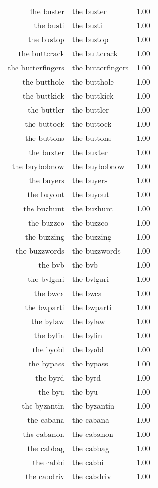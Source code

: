 \begin{table}[ht]
\begin{tabular}{rlr}
  the buster & the buster & 1.00 \\ 
  the busti & the busti & 1.00 \\ 
  the bustop & the bustop & 1.00 \\ 
  the buttcrack & the buttcrack & 1.00 \\ 
  the butterfingers & the butterfingers & 1.00 \\ 
  the butthole & the butthole & 1.00 \\ 
  the buttkick & the buttkick & 1.00 \\ 
  the buttler & the buttler & 1.00 \\ 
  the buttock & the buttock & 1.00 \\ 
  the buttons & the buttons & 1.00 \\ 
  the buxter & the buxter & 1.00 \\ 
  the buybobnow & the buybobnow & 1.00 \\ 
  the buyers & the buyers & 1.00 \\ 
  the buyout & the buyout & 1.00 \\ 
  the buzhunt & the buzhunt & 1.00 \\ 
  the buzzco & the buzzco & 1.00 \\ 
  the buzzing & the buzzing & 1.00 \\ 
  the buzzwords & the buzzwords & 1.00 \\ 
  the bvb & the bvb & 1.00 \\ 
  the bvlgari & the bvlgari & 1.00 \\ 
  the bwca & the bwca & 1.00 \\ 
  the bwparti & the bwparti & 1.00 \\ 
  the bylaw & the bylaw & 1.00 \\ 
  the bylin & the bylin & 1.00 \\ 
  the byobl & the byobl & 1.00 \\ 
  the bypass & the bypass & 1.00 \\ 
  the byrd & the byrd & 1.00 \\ 
  the byu & the byu & 1.00 \\ 
  the byzantin & the byzantin & 1.00 \\ 
  the cabana & the cabana & 1.00 \\ 
  the cabanon & the cabanon & 1.00 \\ 
  the cabbag & the cabbag & 1.00 \\ 
  the cabbi & the cabbi & 1.00 \\ 
  the cabdriv & the cabdriv & 1.00 \\ 

\end{tabular}
\end{table}
